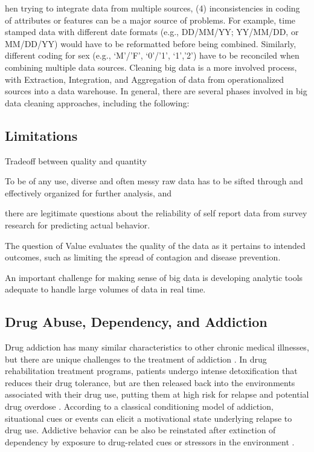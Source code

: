 \documentclass[sigconf]{acmart}
\begin{document}
hen trying to integrate data from multiple sources, (4) inconsistencies in coding of attributes or features can be a major source of problems. For example, time stamped data with different date formats (e.g., DD/MM/YY; YY/MM/DD, or MM/DD/YY) would have to be reformatted before being combined. Similarly, different coding for sex (e.g., ‘M’/’F’, ‘0’/’1’, ‘1’,’2’) have to be reconciled when combining multiple data sources. Cleaning big data is a more involved process, with Extraction, Integration, and Aggregation of data from operationalized sources into a data warehouse. In general, there are several phases involved in big data cleaning approaches, including the following:

\subsection{Limitations}

Tradeoff between quality and quantity


To be of any use, diverse and often messy raw data has to be sifted through and 
effectively organized for further analysis, and 


there are legitimate questions about the reliability of self report data from survey
research for predicting actual behavior. 

The question of 
Value evaluates the quality of the data as it pertains to intended outcomes, such 
as limiting the spread of contagion and disease prevention. 

An important challenge for making sense of big data is developing analytic 
tools adequate to handle large volumes of data in real time.

\subsection{Drug Abuse, Dependency, and Addiction}

Drug addiction has many similar characteristics to other chronic medical 
illnesses, but there are unique challenges to the treatment of addiction
\cite{marsch12, swendson16}. In drug rehabilitation treatment programs, 
patients undergo intense detoxification that reduces their drug tolerance, but 
are then released back into the environments associated with their drug use, 
putting them at high risk for relapse and potential drug overdose 
\cite{johnson11}. According to a classical conditioning model of addiction, 
situational cues or events can elicit a motivational state underlying relapse 
to drug use. Addictive behavior can be also be reinstated after extinction of 
dependency by exposure to drug-related cues or stressors in the environment 
\cite{shaham03}. 
\end{document}
